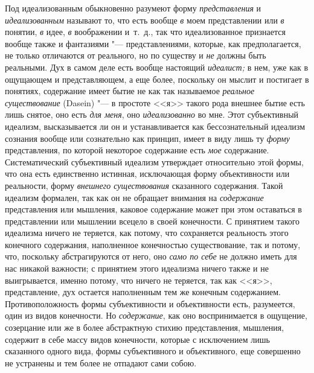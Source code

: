Под идеализованным обыкновенно разумеют форму {\em представления} и
{\em идеализованным} называют то, что есть вообще
{\em в} моем представлении или {\em в} понятии, {\em в} идее,
{\em в} воображении и~т.~д., так что идеализованное
признается вообще также и фантазиями "--- представлениями, которые, как
предполагается, не только отличаются от реального, но по существу и
{\em не} должны быть реальными. Дух в самом деле есть
вообще настоящий {\em идеалист;} в нем, уже как в
ощущающем и представляющем, а еще более, поскольку он мыслит и постигает в
понятиях, содержание имеет бытие не как так называемое
{\em реальное существование} (Dasein) "--- в простоте <<я>>
такого рода внешнее бытие есть лишь снятое, оно есть {\em для меня}, оно
{\em идеализованно} во мне. Этот субъективный идеализм,
высказывается ли он и устанавливается как бессознательный идеализм сознания
вообще или сознательно как принцип, имеет в виду лишь ту
{\em форму} представления, по которой некоторое
содержание есть {\em мое} содержание. Систематический
субъективный идеализм утверждает относительно этой формы, что она есть
единственно истинная, исключающая форму объективности или реальности, форму
{\em внешнего существования} сказанного содержания.
Такой идеализм формален, так как он не обращает внимания на
{\em содержание} представления или мышления, каковое
содержание может при этом оставаться в представлении или мышлении всецело в
своей конечности. С принятием такого идеализма ничего не теряется, как
потому, что сохраняется реальность этого конечного содержания, наполненное
конечностью существование, так и потому, что, поскольку абстрагируются от
него, оно {\em само по себе} не должно иметь для нас
никакой важности; с принятием этого идеализма ничего также и не
выигрывается, именно потому, что ничего не теряется, так как <<я>>,
представление, дух остается наполненным тем же конечным содержанием.
Противоположность формы субъективности и объективности есть, разумеется,
один из видов конечности. Но {\em содержание}, как оно
воспринимается в ощущение, созерцание или же в более абстрактную стихию
представления, мышления, содержит в себе массу видов конечности, которые с
исключением лишь сказанного одного вида, формы субъективного и
объективного, еще совершенно не устранены и тем более не отпадают сами собою.

\bigskip
